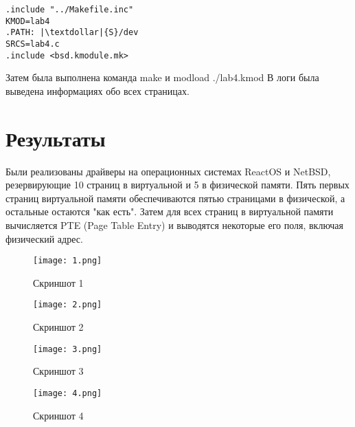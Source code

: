 \documentclass[a4paper, 14pt]{extarticle}
\begin{document}
\begin{verbatim}
.include "../Makefile.inc"
KMOD=lab4
.PATH: |\textdollar|{S}/dev
SRCS=lab4.c
.include <bsd.kmodule.mk>
\end{verbatim}

\begin{flushleft}
Затем была выполнена команда make и modload ./lab4.kmod \newline
В логи была выведена информациях обо всех страницах.
\end{flushleft}
\pagebreak

\section{Результаты} \label{sec:Results}
\begin{flushleft}
Были реализованы драйверы на операционных системах ReactOS и NetBSD, резервирующие 10 страниц в виртуальной и 5 в физической памяти. Пять первых страниц виртуальной памяти обеспечиваются пятью страницами в физической, а остальные остаются "как есть". Затем для всех страниц в виртуальной памяти вычисляется PTE (Page Table Entry) и выводятся некоторые его поля, включая физический адрес.

\begin{figure}[H]

\centering

\texttt{[image: 1.png]}

\caption{Скриншот 1}

\label{fig:mpr}

\end{figure}

\begin{figure}[H]

\centering

\texttt{[image: 2.png]}

\caption{Скриншот 2}

\label{fig:mpr}

\end{figure}

\begin{figure}[H]

\centering

\texttt{[image: 3.png]}

\caption{Скриншот 3}

\label{fig:mpr}

\end{figure}

\begin{figure}[H]

\centering

\texttt{[image: 4.png]}

\caption{Скриншот 4}

\label{fig:mpr}

\end{figure}

\end{flushleft}
\pagebreak 
\end{document}
